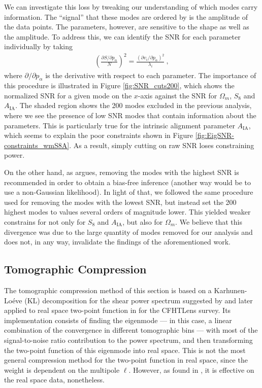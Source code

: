 \documentclass[twocolumn,nofootinbib]{\docclass}
\newcommand{\rf}[1]{Figure \ref{fig:#1}}
\newcommand\bea{\begin{eqnarray}}
\newcommand\eea{\end{eqnarray}}
\begin{document}
We can investigate this loss by tweaking our understanding of which modes carry information. The ``signal'' that these modes are ordered by is the amplitude of the data points.  The parameters, however, are sensitive to the shape as well as the amplitude. To address this, we can identify the SNR for each parameter individually by taking
\bea
\left(\frac{\partial S/\partial p_\alpha}{N}\right)^2 = \frac{(\partial v_i / \partial p_\alpha)^2}{\lambda_i}\
,\eea
where $\partial /\partial p_\alpha$ is the derivative with respect to each parameter. The importance of this procedure is illustrated in \rf{SNR_cuts200}, which shows the normalized SNR for a given mode on the $x$-axis against the SNR for $\Omega_m$, $S_8$ and $A_{\text{IA}}$. The shaded region shows the 200 modes excluded in the previous analysis, where we see the presence of low SNR modes that contain information about the parameters. This is particularly true for the intrinsic alignment parameter $A_{\text{IA}}$, which seems to explain the poor constraints shown in \rf{EigSNR-constraints_wmS8A}. As a result, simply cutting on raw SNR loses constraining power.

On the other hand, as \cite{Louca:2020} argues, removing the modes with the highest SNR is recommended in order to obtain a bias-free inference (another way would be to use a non-Gaussian likelihood). In light of that, we followed the same procedure used for removing the modes with the lowest SNR, but instead set the 200 highest modes to values several orders of magnitude lower. This yielded weaker constrains for not only for $S_8$ and $A_{\text{IA}}$, but also for $\Omega_m$. We believe that this divergence was due to the large quantity of modes removed for our analysis and does not, in any way, invalidate the findings of the aforementioned work.

\subsection{Tomographic Compression}
\label{subsec:tomographic_compression}

The tomographic compression method of this section is based on a Karhunen-Lo\'eve (KL) decomposition for the shear power spectrum suggested by \cite{Alonso:2017hhj} and later applied to real space two-point function in \cite{Bellini:2019ssw} for the CFHTLens survey. Its implementation consists of finding the eigenmode --- in this case, a linear combination of the convergence in different tomographic bins --- with most of the signal-to-noise ratio contribution to the power spectrum, and then transforming the two-point function of this eigenmode into real space. This is not the most general compression method for the two-point function in real space, since the weight is dependent on the multipole $\ell$. However, as found in \cite{Bellini:2019ssw}, it is effective on the real space data, nonetheless.
\end{document}
